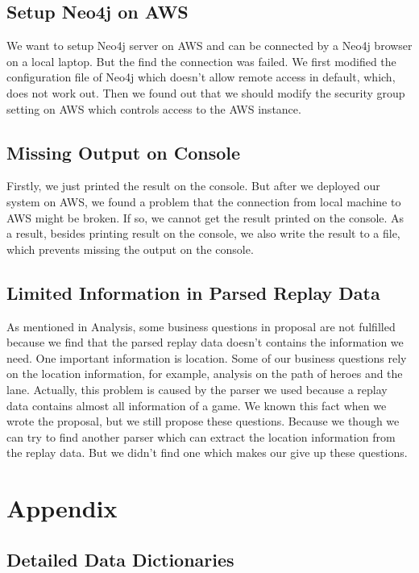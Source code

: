 \documentclass{article}
\begin{document}
\subsection{Setup Neo4j on AWS}

We want to setup Neo4j server on AWS and can be connected by a Neo4j browser on a local laptop. But the find the connection was failed. We first modified the configuration file of Neo4j which doesn't allow remote access in default, which, does not work out. Then we found out that we should modify the security group setting on AWS which controls access to the AWS instance.

\subsection{Missing Output on Console}

Firstly, we just printed the result on the console.
But after we deployed our system on AWS, we found a problem that the connection from local machine to AWS might be broken.
If so, we cannot get the result printed on the console.
As a result, besides printing result on the console, we also write the result to a file, which prevents missing the output on the console.

\subsection{Limited Information in Parsed Replay Data}

As mentioned in Analysis, some business questions in proposal are not fulfilled because we find that the parsed replay data doesn't contains the information we need. One important information is location. Some of our business questions rely on the location information, for example, analysis on the path of heroes and the lane. Actually, this problem is caused by the parser we used because a replay data contains almost all information of a game. We known this fact when we wrote the proposal, but we still propose these questions. Because we though we can try to find another parser which can extract the location information from the replay data. But we didn't find one which makes our give up these questions.

\printglossary

\section{Appendix}

\subsection{Detailed Data Dictionaries}
\end{document}
